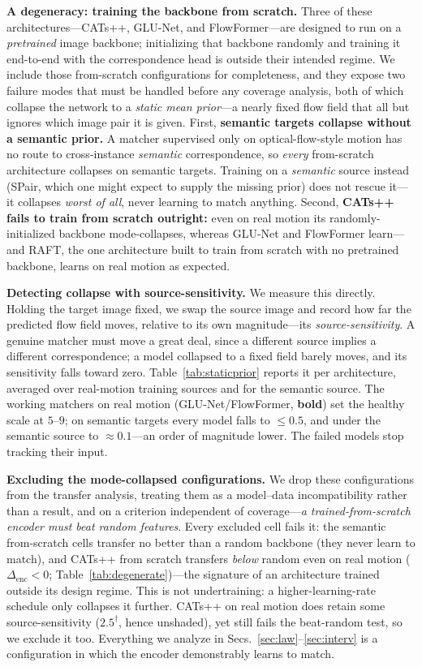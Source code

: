 \documentclass[runningheads]{llncs}
\begin{document}
\noindent\textbf{A degeneracy: training the backbone from scratch.} Three of
these architectures---CATs++, GLU-Net, and FlowFormer---are designed to run on a
\emph{pretrained} image backbone; initializing that backbone randomly and
training it end-to-end with the correspondence head is outside their intended
regime. We include those from-scratch configurations for completeness, and they
expose two failure modes that must be handled before any coverage analysis, both
of which collapse the network to a \emph{static mean prior}---a nearly fixed flow
field that all but ignores which image pair it is given.
First, \textbf{semantic targets collapse without a semantic prior.} A matcher
supervised only on optical-flow-style motion has no route to cross-instance
\emph{semantic} correspondence, so \emph{every} from-scratch architecture
collapses on semantic targets. Training on a \emph{semantic} source instead
(SPair, which one might expect to supply the missing prior) does not rescue it---%
it collapses \emph{worst of all}, never learning to match anything.
Second, \textbf{CATs++ fails to train from scratch outright:} even on real motion
its randomly-initialized backbone mode-collapses, whereas GLU-Net and FlowFormer
learn---and RAFT, the one architecture built to train from scratch with no
pretrained backbone, learns on real motion as expected.

\noindent\textbf{Detecting collapse with source-sensitivity.} We measure this
directly. Holding the target image fixed, we swap the source image and record how
far the predicted flow field moves, relative to its own magnitude---its
\emph{source-sensitivity}. A genuine matcher must move a great deal, since a
different source implies a different correspondence; a model collapsed to a fixed
field barely moves, and its sensitivity falls toward zero.
Table~\ref{tab:staticprior} reports it per architecture, averaged over real-motion
training sources and for the semantic source. The working matchers on real motion
(GLU-Net/FlowFormer, \textbf{bold}) set the healthy scale at $5$--$9$; on semantic
targets every model falls to $\le0.5$, and under the semantic source to
${\approx}0.1$---an order of magnitude lower. The failed models stop tracking
their input.

\noindent\textbf{Excluding the mode-collapsed configurations.} We drop these
configurations from the transfer analysis, treating them as a model--data
incompatibility rather than a result, and on a criterion independent of
coverage---\emph{a trained-from-scratch encoder must beat random features}. Every
excluded cell fails it: the semantic from-scratch cells transfer no better than a
random backbone (they never learn to match), and CATs++ from scratch transfers
\emph{below} random even on real motion ($\Delta_{\text{enc}}<0$;
Table~\ref{tab:degenerate})---the signature of an architecture trained
outside its design regime. This is not undertraining: a higher-learning-rate
schedule only collapses it further. CATs++ on real motion does retain some
source-sensitivity ($2.5^{\dagger}$, hence unshaded), yet still fails the
beat-random test, so we exclude it too. Everything we analyze in
Secs.~\ref{sec:law}--\ref{sec:interv} is a configuration in which the encoder
demonstrably learns to match.
\end{document}
